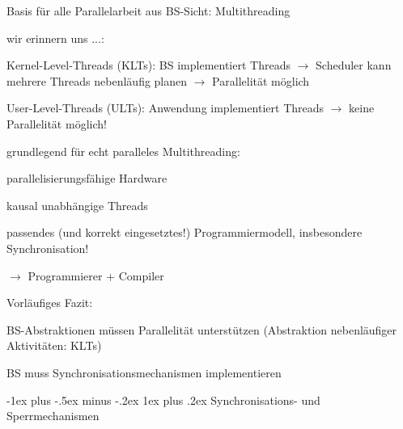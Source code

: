 \documentclass[a4paper]{article}
\makeatletter
\renewcommand{\subsubsection}{\@startsection{subsubsection}{3}{0mm}%
 {-1ex plus -.5ex minus -.2ex}%
 {1ex plus .2ex}%
 {\normalfont\small\bfseries}}
\makeatother
\begin{document}
\begin{multicols}{3}
    \begin{itemize*}
        \item
        Basis für alle Parallelarbeit aus BS-Sicht: Multithreading
        \item
        wir erinnern uns ...:
        \begin{itemize*}
            \item Kernel-Level-Threads (KLTs): BS implementiert Threads $\rightarrow$ Scheduler kann mehrere Threads nebenläufig planen $\rightarrow$ Parallelität möglich
            \item User-Level-Threads (ULTs): Anwendung implementiert Threads $\rightarrow$ keine Parallelität möglich!
        \end{itemize*}
        \item
        grundlegend für echt paralleles Multithreading:
        \begin{itemize*}
            \item parallelisierungsfähige Hardware
            \item kausal unabhängige Threads
            \item passendes (und korrekt eingesetztes!) Programmiermodell, insbesondere Synchronisation!
            \item[$\rightarrow$] Programmierer + Compiler
        \end{itemize*}
    \end{itemize*}

    Vorläufiges Fazit:

    \begin{itemize*}
        \item
        BS-Abstraktionen müssen Parallelität unterstützen (Abstraktion
        nebenläufiger Aktivitäten: KLTs)
        \item
        BS muss Synchronisationsmechanismen implementieren
    \end{itemize*}


    \subsubsection{Synchronisations- und
        Sperrmechanismen}


\end{multicols}
\end{document}
